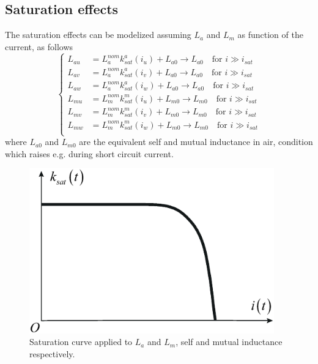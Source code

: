 \documentclass[11pt,a4paper]{scrartcl}
\numberwithin{equation}{section}
\theoremstyle{it}
\theoremstyle{definition}
\begin{document}
\begin{onehalfspace}
	\section{Saturation effects}
	The saturation effects can be modelized assuming $L_a$ and $L_m$ as function of the current, as follows
	\begin{equation}\left\lbrace 
		\begin{aligned}
			L_{au} &= L_a^{nom} k_{sat}^{a}(i_u) + L_{a0}\rightarrow L_{a0}\quad\text{for } i\gg i_{sat}  \\[6pt]
			L_{av} &= L_a^{nom} k_{sat}^{a}(i_v) + L_{a0}\rightarrow L_{a0}\quad\text{for } i\gg i_{sat}  \\[6pt]
			L_{aw} &= L_a^{nom} k_{sat}^{a}(i_w) + L_{a0}\rightarrow L_{a0}\quad\text{for } i\gg i_{sat}  \\[6pt]
			L_{mu} &= L_m^{nom} k_{sat}^{m}(i_u) + L_{m0}\rightarrow L_{m0}\quad\text{for } i\gg i_{sat}  \\[6pt]
			L_{mv} &= L_m^{nom} k_{sat}^{m}(i_v) + L_{m0}\rightarrow L_{m0}\quad\text{for } i\gg i_{sat}  \\[6pt]
			L_{mw} &= L_m^{nom} k_{sat}^{m}(i_w) + L_{m0}\rightarrow L_{m0}\quad\text{for } i\gg i_{sat}  \\[6pt]
		\end{aligned}\right. 
	\end{equation}
	where $L_{a0}$ and $L_{m0}$ are the equivalent self and mutual inductance in air, condition which raises e.g. during short circuit current. 
	\begin{figure}[H]
		\centering
		\includegraphics[width = 300pt, angle = 0, 
		keepaspectratio]{figures/saturation-curve-ver-i.eps}
		\captionsetup{width=0.75\textwidth, font=small}	
		\caption{Saturation curve applied to $L_a$ and $L_m$, self and mutual inductance respectively.}
		\label{fig4}
	\end{figure}
	

\end{onehalfspace}
\end{document}
